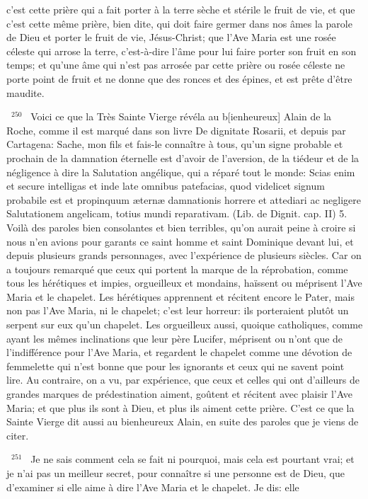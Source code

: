 \documentclass[paper=a5,pagesize=pdftex,fontsize=15pt,headinclude=on,twoside=off]{scrbook}
\newcommand{\negphantom}[1]{\settowidth{\dimen0}{#1}\hspace*{-\dimen0}}
\newcommand{\versenb}[1]{\par \vspace{10pt}~\negphantom{~${}^{#1}$~}${}^{#1}$~}
\begin{document}
c'est cette prière qui a fait porter à la terre sèche et stérile le fruit de vie, et que c'est cette même prière, bien dite,
qui doit faire germer dans nos âmes la parole de Dieu et porter le fruit de vie, Jésus-Christ; que l'Ave Maria est une
rosée céleste qui arrose la terre, c'est-à-dire l'âme pour lui faire porter son fruit en son temps; et qu'une âme qui
n'est pas arrosée par cette prière ou rosée céleste ne porte point de fruit et ne donne que des ronces et des
épines, et est prête d'être maudite.
\versenb{250} Voici ce que la Très Sainte Vierge révéla au b[ienheureux] Alain de la Roche, comme il est marqué dans son
livre De dignitate Rosarii, et depuis par Cartagena: Sache, mon fils et fais-le connaître à tous, qu'un signe probable
et prochain de la damnation éternelle est d'avoir de l'aversion, de la tiédeur et de la négligence à dire la Salutation
angélique, qui a réparé tout le monde: Scias enim et secure intelligas et inde late omnibus patefacias, quod
videlicet signum probabile est et propinquum æternæ damnationis horrere et attediari ac negligere Salutationem
angelicam, totius mundi reparativam. (Lib. de Dignit. cap. II) 5. Voilà des paroles bien consolantes et bien terribles,
qu'on aurait peine à croire si nous n'en avions pour garants ce saint homme et saint Dominique devant lui, et
depuis plusieurs grands personnages, avec l'expérience de plusieurs siècles. Car on a toujours remarqué que
ceux qui portent la marque de la réprobation, comme tous les hérétiques et impies, orgueilleux et mondains,
haïssent ou méprisent l'Ave Maria et le chapelet. Les hérétiques apprennent et récitent encore le Pater, mais non
pas l'Ave Maria, ni le chapelet; c'est leur horreur: ils porteraient plutôt un serpent sur eux qu'un chapelet. Les
orgueilleux aussi, quoique catholiques, comme ayant les mêmes inclinations que leur père Lucifer, méprisent ou
n'ont que de l'indifférence pour l'Ave Maria, et regardent le chapelet comme une dévotion de femmelette qui n'est
bonne que pour les ignorants et ceux qui ne savent point lire. Au contraire, on a vu, par expérience, que ceux et
celles qui ont d'ailleurs de grandes marques de prédestination aiment, goûtent et récitent avec plaisir l'Ave Maria;
et que plus ils sont à Dieu, et plus ils aiment cette prière. C'est ce que la Sainte Vierge dit aussi au bienheureux
Alain, en suite des paroles que je viens de citer.
\versenb{251} Je ne sais comment cela se fait ni pourquoi, mais cela est pourtant vrai; et je n'ai pas un meilleur secret, pour
connaître si une personne est de Dieu, que d'examiner si elle aime à dire l'Ave Maria et le chapelet. Je dis: elle
\end{document}
